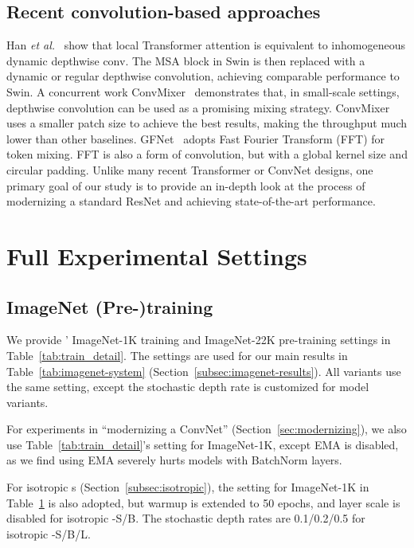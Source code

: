 \subsection{Recent convolution-based approaches} 
Han \emph{et al.}~\cite{han2021demystifying} show that local Transformer attention is equivalent to inhomogeneous dynamic depthwise conv. The MSA block in Swin is then replaced with a dynamic or regular depthwise convolution, achieving comparable performance to Swin. A concurrent work ConvMixer~\cite{convmixer} demonstrates that, in small-scale settings, depthwise convolution can be used as a promising mixing strategy. ConvMixer uses a smaller patch size to achieve the best results, making the throughput much lower than other baselines. GFNet~\cite{rao2021global} adopts Fast Fourier Transform (FFT) for token mixing. FFT is also a form of convolution, but with a global kernel size and circular padding. Unlike many recent Transformer or ConvNet designs, one primary goal of our study is to provide an in-depth look at the process of modernizing a standard ResNet and achieving state-of-the-art performance.


\section{Full Experimental Settings}
\label{sec:setting}
\subsection{ImageNet (Pre-)training} 
\label{subsec:setting}
We provide ' ImageNet-1K training and ImageNet-22K pre-training settings in Table~\ref{tab:train_detail}. The settings are used for our main results in Table~\ref{tab:imagenet-system} (Section~\ref{subsec:imagenet-results}).  All \cnn{} variants use the same setting, except the stochastic depth rate is customized for model variants. 

For experiments in ``modernizing a ConvNet'' (Section~\ref{sec:modernizing}), we also use Table~\ref{tab:train_detail}'s setting for ImageNet-1K, except EMA is disabled, as we find using EMA severely hurts models with BatchNorm layers.

For isotropic \cnn{}s (Section~\ref{subsec:isotropic}), the setting for ImageNet-1K in Table~\ref{sec:setting} is also adopted, but warmup is extended to 50 epochs, and layer scale is disabled for isotropic \cnn{}-S/B. The stochastic depth rates are 0.1/0.2/0.5 for isotropic \cnn{}-S/B/L.

